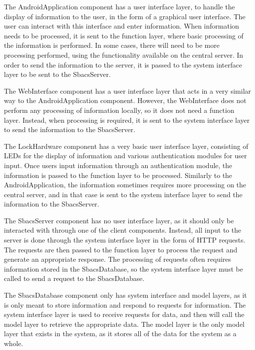 \documentclass[12pt]{report}
\begin{document}
The AndroidApplication component has a user interface layer, to handle the display of information to the user,
in the form of a graphical user interface. The user can interact with this interface and enter information.
When information needs to be processed, it is sent to the function layer, where basic processing of the
information is performed. In some cases, there will need to be more processing performed, using the functionality
available on the central server. In order to send the information to the server, it is passed to the system
interface layer to be sent to the SbacsServer.

The WebInterface component has a user interface layer that acts in a very similar way to the AndroidApplication
component. However, the WebInterface does not perform any processing of information locally, so it does not
need a function layer. Instead, when processing is required, it is sent to the system interface layer to send
the information to the SbacsServer.

The LockHardware component has a very basic user interface layer, consisting of LEDs for the display of information
and various authentication modules for user input. Once users input information through an authentication module,
the information is passed to the function layer to be processed. Similarly to the AndroidApplication, the information
sometimes requires more processing on the central server, and in that case is sent to the system interface layer
to send the information to the SbacsServer.

The SbacsServer component has no user interface layer, as it should only be interacted with through one of the client
components. Instead, all input to the server is done through the system interface layer in the form of HTTP requests.
The requests are then passed to the function layer to process the request and generate an appropriate response. The
processing of requests often requires information stored in the SbacsDatabase, so the system interface layer must be
called to send a request to the SbacsDatabase.

The SbacsDatabase component only has system interface and model layers, as it is only meant to store information and
respond to requests for information. The system interface layer is used to receive requests for data, and then will
call the model layer to retrieve the appropriate data. The model layer is the only model layer that exists in the
system, as it stores all of the data for the system as a whole.


\end{document}
